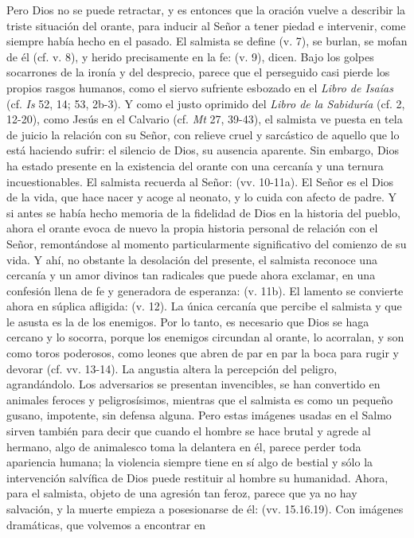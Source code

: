 \begin{body}
Pero Dios no se puede retractar, y es entonces que la oración vuelve a describir la triste situación del orante, para inducir al Señor a tener piedad e intervenir, come siempre había hecho en el pasado. El salmista se define  (v. 7), se burlan, se mofan de él (cf. v. 8), y herido precisamente en la fe:  (v. 9), dicen. Bajo los golpes socarrones de la ironía y del desprecio, parece que el perseguido casi pierde los propios rasgos humanos, como el siervo sufriente esbozado en el \emph{Libro de Isaías} (cf. \emph{Is} 52, 14; 53, 2b-3). Y como el justo oprimido del \emph{Libro de la Sabiduría} (cf. 2, 12-20), como Jesús en el Calvario (cf. \emph{Mt} 27, 39-43), el salmista ve puesta en tela de juicio la relación con su Señor, con relieve cruel y sarcástico de aquello que lo está haciendo sufrir: el silencio de Dios, su ausencia aparente. Sin embargo, Dios ha estado presente en la existencia del orante con una cercanía y una ternura incuestionables. El salmista recuerda al Señor:  (vv. 10-11a). El Señor es el Dios de la vida, que hace nacer y acoge al neonato, y lo cuida con afecto de padre. Y si antes se había hecho memoria de la fidelidad de Dios en la historia del pueblo, ahora el orante evoca de nuevo la propia historia personal de relación con el Señor, remontándose al momento particularmente significativo del comienzo de su vida. Y ahí, no obstante la desolación del presente, el salmista reconoce una cercanía y un amor divinos tan radicales que puede ahora exclamar, en una confesión llena de fe y generadora de esperanza:  (v. 11b). El lamento se convierte ahora en súplica afligida:  (v. 12). La única cercanía que percibe el salmista y que le asusta es la de los enemigos. Por lo tanto, es necesario que Dios se haga cercano y lo socorra, porque los enemigos circundan al orante, lo acorralan, y son como toros poderosos, como leones que abren de par en par la boca para rugir y devorar (cf. vv. 13-14). La angustia altera la percepción del peligro, agrandándolo. Los adversarios se presentan invencibles, se han convertido en animales feroces y peligrosísimos, mientras que el salmista es como un pequeño gusano, impotente, sin defensa alguna. Pero estas imágenes usadas en el Salmo sirven también para decir que cuando el hombre se hace brutal y agrede al hermano, algo de animalesco toma la delantera en él, parece perder toda apariencia humana; la violencia siempre tiene en sí algo de bestial y sólo la intervención salvífica de Dios puede restituir al hombre su humanidad. Ahora, para el salmista, objeto de una agresión tan feroz, parece que ya no hay salvación, y la muerte empieza a posesionarse de él:  (vv. 15.16.19). Con imágenes dramáticas, que volvemos a encontrar en 
\end{body}

